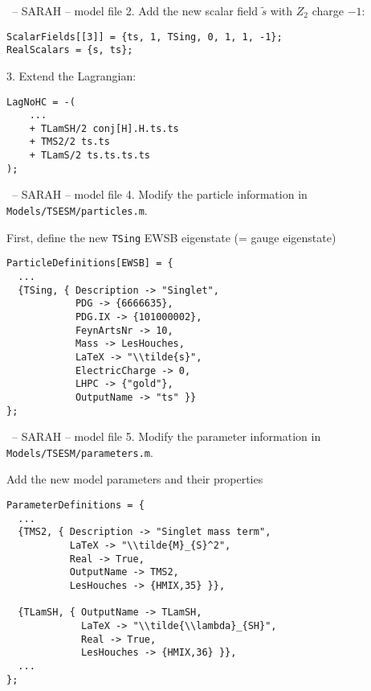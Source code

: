 \documentclass[11pt]{beamer}
\begin{document}

\begin{frame}[fragile]{\insertsection\ -- SARAH -- model file}
  2. Add the new scalar field $\tilde{s}$ with $Z_2$ charge $-1$:
  \begin{lstlisting}
ScalarFields[[3]] = {ts, 1, TSing, 0, 1, 1, -1};
RealScalars = {s, ts};\end{lstlisting}
  3. Extend the Lagrangian:
  \begin{lstlisting}
LagNoHC = -(
    ...
    + TLamSH/2 conj[H].H.ts.ts
    + TMS2/2 ts.ts
    + TLamS/2 ts.ts.ts.ts
);\end{lstlisting}
\end{frame}


\begin{frame}[fragile]{\insertsection\ -- SARAH -- model file}
  4. Modify the particle information in
  \texttt{Models/TSESM/particles.m}.

  \bigskip

  First, define the new \texttt{TSing} EWSB eigenstate (= gauge eigenstate)
  \begin{lstlisting}
ParticleDefinitions[EWSB] = {
  ...
  {TSing, { Description -> "Singlet",
            PDG -> {6666635},
            PDG.IX -> {101000002},
            FeynArtsNr -> 10,
            Mass -> LesHouches,
            LaTeX -> "\\tilde{s}",
            ElectricCharge -> 0,
            LHPC -> {"gold"},
            OutputName -> "ts" }}
};\end{lstlisting}
\end{frame}


\begin{frame}[fragile]{\insertsection\ -- SARAH -- model file}
  5. Modify the parameter information in
  \texttt{Models/TSESM/parameters.m}.

  \bigskip

  Add the new model parameters and their properties
  \begin{lstlisting}
ParameterDefinitions = {
  ...
  {TMS2, { Description -> "Singlet mass term",
           LaTeX -> "\\tilde{M}_{S}^2",
           Real -> True, 
           OutputName -> TMS2,
           LesHouches -> {HMIX,35} }}, 

  {TLamSH, { OutputName -> TLamSH,
             LaTeX -> "\\tilde{\\lambda}_{SH}",
             Real -> True, 
             LesHouches -> {HMIX,36} }},
  ...
};\end{lstlisting}
\end{frame}
\end{document}
